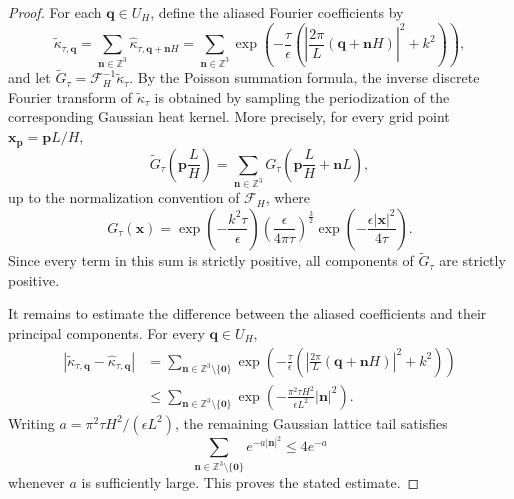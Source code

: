 \documentclass[10pt,a4paper]{amsart}
\begin{document}
\begin{proof}
For each $\mathbf q\in U_H$, define the aliased Fourier coefficients by
\begin{equation}
\widetilde{\kappa}_{\tau,\mathbf q}
=
\sum_{\mathbf n\in\mathbb Z^3}
\hat{\kappa}_{\tau,\mathbf q+\mathbf nH}
=
\sum_{\mathbf n\in\mathbb Z^3}
\exp\left(
-\frac{\tau}{\epsilon}
\left(
\left|
\frac{2\pi}{L}
(\mathbf q+\mathbf nH)
\right|^2
+k^2
\right)
\right),
\end{equation}
and let
$\widetilde{G}_{\tau}
=
\mathcal{F}_H^{-1}\widetilde{\kappa}_{\tau}$.
By the Poisson summation formula, the inverse discrete Fourier transform of
$\widetilde{\kappa}_{\tau}$ is obtained by sampling the periodization of the
corresponding Gaussian heat kernel. More precisely, for every grid point
$\mathbf x_{\mathbf p}=\mathbf pL/H$,
\begin{equation}
\widetilde{G}_{\tau}
\left(
\mathbf p\frac{L}{H}
\right)
=
\sum_{\mathbf n\in\mathbb Z^3}
G_{\tau}
\left(
\mathbf p\frac{L}{H}+\mathbf nL
\right),
\end{equation}
up to the normalization convention of $\mathcal{F}_H$, where
\begin{equation}
G_{\tau}(\mathbf x)
=
\exp\left(-\frac{k^2\tau}{\epsilon}\right)
\left(\frac{\epsilon}{4\pi\tau}\right)^{\frac{3}{2}}
\exp\left(
-\frac{\epsilon|\mathbf x|^2}{4\tau}
\right).
\end{equation}
Since every term in this sum is strictly positive, all components of
$\widetilde{G}_{\tau}$ are strictly positive.

It remains to estimate the difference between the aliased coefficients and
their principal components. For every $\mathbf q\in U_H$,
\begin{equation}
\begin{aligned}
\left|
\widetilde{\kappa}_{\tau,\mathbf q}
-
\hat{\kappa}_{\tau,\mathbf q}
\right|
&=
\sum_{\mathbf n\in\mathbb Z^3\setminus\{\mathbf0\}}
\exp\left(
-\frac{\tau}{\epsilon}
\left(
\left|
\frac{2\pi}{L}
(\mathbf q+\mathbf nH)
\right|^2
+k^2
\right)
\right)
\\
&\leq
\sum_{\mathbf n\in\mathbb Z^3\setminus\{\mathbf0\}}
\exp\left(
-\frac{\pi^2\tau H^2}{\epsilon L^2}
|\mathbf n|^2
\right).
\end{aligned}
\end{equation}
Writing $a=\pi^2\tau H^2/(\epsilon L^2)$, the remaining Gaussian lattice
tail satisfies
\begin{equation}
\sum_{\mathbf n\in\mathbb Z^3\setminus\{\mathbf0\}}
e^{-a|\mathbf n|^2}
\leq 4e^{-a}
\end{equation}
whenever $a$ is sufficiently large. This proves the stated estimate.


\end{proof}
\end{document}
